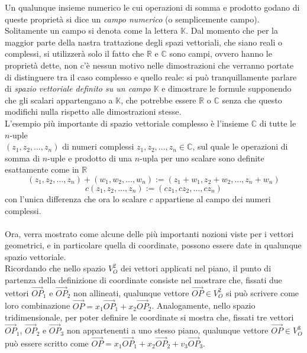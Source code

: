 Un qualunque insieme numerico le cui operazioni di somma e prodotto godano di queste proprietà si dice un \textit{campo numerico} (o semplicemente campo). Solitamente un campo si denota come la lettera $\mathds{K}$. Dal momento che per la maggior parte della nastra trattazione degli spazi vettoriali, che siano reali o complessi, si utilizzerà solo il fatto che $\mathds{R}$ e $\mathds{C}$ sono campi, ovvero hanno le proprietà dette, non c'è nessun motivo nelle dimostrazioni che verranno portate di distinguere tra il caso complesso e quello reale: si può tranquillamente parlare di \textit{spazio vettoriale definito su un campo $\mathds{K}$} e dimostrare le formule supponendo che gli scalari appartengano a $\mathds{K}$, che potrebbe essere  $\mathds{R}$ o $\mathds{C}$ senza che questo modifichi nulla rispetto alle dimostrazioni stesse.\\
L'esempio più importante di spazio vettoriale complesso è l'insieme  $\mathds{C}$ di tutte le $n$-uple\\ $(z_1,z_2,\dots,z_n)$ di numeri complessi $z_1,z_2,\dots,z_n\in \mathds{C}$, sul quale le operazioni di somma di $n$-uple e prodotto di una $n$-upla per uno scalare sono definite esattamente come in $\mathds{R}$
\begin{equation}
  \label{eq:spaziovect3}
  (z_1,z_2,\dots,z_n)+(w_1,w_2,\dots,w_n):=(z_1+w_1,z_2+w_2,\dots,z_n+w_n)
\end{equation}
\begin{equation}
  \label{eq:spaziovect4}
  c(z_1,z_2,\dots,z_n):=(cz_1,cz_2,\dots,cz_n)
\end{equation}
con l'unica differenza che ora lo scalare $c$ appartiene al campo dei numeri complessi.\\\\
Ora, verra mostrato come alcune delle più importanti nozioni viste per i vettori geometrici, e in particolare quella di coordinate, possono essere date in qualunque spazio vettoriale.\\
Ricordando che nello spazio $V^2_O$ dei vettori applicati nel piano, il punto di partenza della definizione di coordinate consiste nel mostrare che, fissati due vettori $\vec{OP}_1$ e $\vec{OP}_2$ non allineati, qualunque vettore $\vec{OP}\in V_O^2$ si può scrivere come loro combinazione $\vec{OP}=x_1\vec{OP}_1+x_2\vec{OP}_2$. Analogamente, nello spazio tridimensionale, per poter definire le coordinate si mostra che, fissati tre vettori $\vec{OP}_1$, $\vec{OP}_2$ e $\vec{OP}_3$ non appartenenti a uno stesso piano, qualunque vettore $\vec{OP}\in V_O^3$ può essere scritto come $\vec{OP}=x_1\vec{OP}_1+x_2\vec{OP}_2+v_3\vec{OP}_3$.\\
